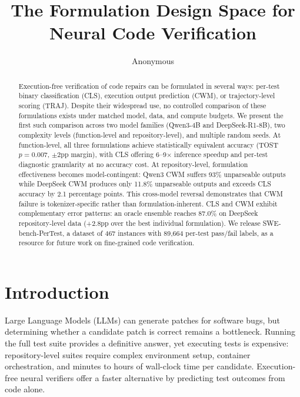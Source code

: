 \documentclass[11pt,a4paper]{article}
\title{The Formulation Design Space for Neural Code Verification}
\author{Anonymous}
\date{}
\begin{document}
\maketitle

\begin{abstract}
Execution-free verification of code repairs can be formulated in several ways: per-test binary classification (CLS), execution output prediction (CWM), or trajectory-level scoring (TRAJ).
Despite their widespread use, no controlled comparison of these formulations exists under matched model, data, and compute budgets.
We present the first such comparison across two model families (Qwen3-4B and DeepSeek-R1-8B), two complexity levels (function-level and repository-level), and multiple random seeds.
At function-level, all three formulations achieve statistically equivalent accuracy (TOST $p{=}0.007$, $\pm$2pp margin), with CLS offering 6--9$\times$ inference speedup and per-test diagnostic granularity at no accuracy cost.
At repository-level, formulation effectiveness becomes model-contingent: Qwen3 CWM suffers 93\% unparseable outputs while DeepSeek CWM produces only 11.8\% unparseable outputs and exceeds CLS accuracy by 2.1 percentage points.
This cross-model reversal demonstrates that CWM failure is tokenizer-specific rather than formulation-inherent.
CLS and CWM exhibit complementary error patterns: an oracle ensemble reaches 87.0\% on DeepSeek repository-level data (+2.8pp over the best individual formulation).
We release SWE-bench-PerTest, a dataset of 467 instances with 89,664 per-test pass/fail labels, as a resource for future work on fine-grained code verification.
\end{abstract}

\section{Introduction}

Large Language Models (LLMs) can generate patches for software bugs, but determining whether a candidate patch is correct remains a bottleneck.
Running the full test suite provides a definitive answer, yet executing tests is expensive: repository-level suites require complex environment setup, container orchestration, and minutes to hours of wall-clock time per candidate.
Execution-free neural verifiers offer a faster alternative by predicting test outcomes from code alone.
\end{document}
